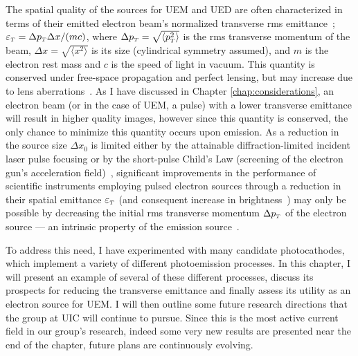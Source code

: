 

The spatial quality of the sources for UEM and UED are often characterized in terms of their emitted electron beam's normalized transverse rms emittance~\cite{dowell_quantum_2009,jensen_emittance_2010}; $\varepsilon_{{\scriptscriptstyle T}} = \Delta p_{{\scriptscriptstyle T}} \Delta x / (m c)$, where $\Delta p_{{\scriptscriptstyle T}} = \sqrt{ \langle p_{{\scriptscriptstyle T}}^2 \rangle }$ is the rms transverse momentum of the beam, $\Delta x = \sqrt{ \langle x^2 \rangle }$ is its size (cylindrical symmetry assumed), and $m$ is the electron rest mass and $c$ is the speed of light in vacuum.
This quantity is conserved under free-space propagation and perfect lensing, but may increase due to lens aberrations~\cite{oshea_reversible_1998}.
As I have discussed in Chapter \ref{chap:considerations}, an electron beam (or in the case of UEM, a pulse) with a lower transverse emittance will result in higher quality images, however since this quantity is conserved, the only chance to minimize this quantity occurs upon emission.
As a reduction in the source size $\Delta x_0$ is limited either by the attainable diffraction-limited incident laser pulse focusing or by the short-pulse Child's Law (screening of the electron gun's acceleration field)~\cite{valfells_effects_2002}, significant improvements in the performance of scientific instruments employing pulsed electron sources through a reduction in their spatial emittance $\varepsilon_{{\scriptscriptstyle T}}$ (and consequent increase in brightness~\cite{berger_dc_2009}) may only be possible by decreasing the initial rms transverse momentum $\Delta p_{{\scriptscriptstyle T}}$ of the electron source --- an intrinsic property of the emission source~\cite{dowell_quantum_2009,jensen_emittance_2010}.

To address this need, I have experimented with many candidate photocathodes, which implement a variety of different photoemission processes.
In this chapter, I will present an example of several of these different processes, discuss its prospects for reducing the transverse emittance and finally assess its utility as an electron source for UEM.
I will then outline some future research directions that the group at UIC will continue to pursue.
Since this is the most active current field in our group's research, indeed some very new results are presented near the end of the chapter, future plans are continuously evolving.

